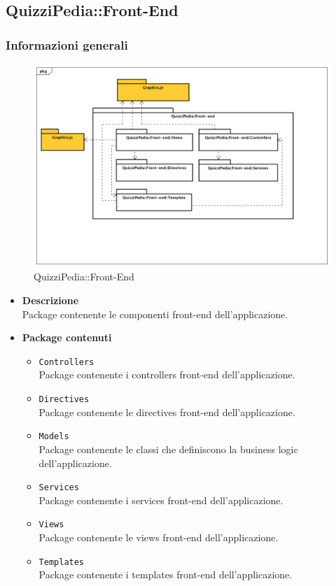 \subsection{QuizziPedia::Front-End}
\subsubsection{Informazioni generali}
\label{QuizziPedia::Front-End}
\begin{figure}
	\centering
	\includegraphics[scale=0.45]{UML/Package/QuizziPedia_Front-End.png}
	\caption{QuizziPedia::Front-End}
\end{figure}

	\begin{itemize}
		\item \textbf{Descrizione} \\ Package contenente le componenti front-end dell'applicazione.
		\item \textbf{Package contenuti}
		\begin{itemize}
			\item \texttt{Controllers} \\ Package contenente i controllers front-end dell'applicazione.
			\item \texttt{Directives} \\ Package contenente le directives front-end dell'applicazione.
			\item \texttt{Models} \\ Package contenente le classi che definiscono la business logic dell'applicazione.
			\item \texttt{Services} \\ Package contenente i services front-end dell'applicazione.
			\item \texttt{Views} \\ Package contenente le views front-end dell'applicazione.
			\item \texttt{Templates} \\ Package contenente i templates front-end dell'applicazione.
		\end{itemize}
	\end{itemize}
	